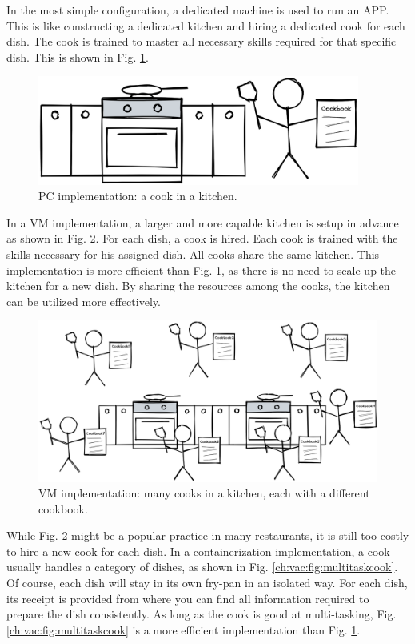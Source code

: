 In the most simple configuration, a dedicated machine is used to run an APP. This is like constructing a dedicated kitchen and hiring a dedicated cook for each dish. The cook is trained to master all necessary skills required for that specific dish. This is shown in Fig. \ref{ch:vac:fig:acookinakitchen}.
\begin{figure}
	\centering
	\includegraphics[width=300pt]{chapters/ch-virtualization-and-containerization/figures/acookinakitchen.png}
	\caption{PC implementation: a cook in a kitchen.} \label{ch:vac:fig:acookinakitchen}
\end{figure}

In a VM implementation, a larger and more capable kitchen is setup in advance as shown in Fig. \ref{ch:vac:fig:manycooksinakitchen}. For each dish, a cook is hired. Each cook is trained with the skills necessary for his assigned dish. All cooks share the same kitchen. This implementation is more efficient than Fig. \ref{ch:vac:fig:acookinakitchen}, as there is no need to scale up the kitchen for a new dish. By sharing the resources among the cooks, the kitchen can be utilized more effectively.
\begin{figure}
	\centering \includegraphics[width=350pt]{chapters/ch-virtualization-and-containerization/figures/manycooksinakitchen.png}
	\caption{VM implementation: many cooks in a kitchen, each with a different cookbook.} \label{ch:vac:fig:manycooksinakitchen}
\end{figure}

While Fig. \ref{ch:vac:fig:manycooksinakitchen} might be a popular practice in many restaurants, it is still too costly to hire a new cook for each dish. In a containerization implementation, a cook usually handles a category of dishes, as shown in Fig. \ref{ch:vac:fig:multitaskcook}. Of course, each dish will stay in its own fry-pan in an isolated way. For each dish, its receipt is provided from where you can find all information required to prepare the dish consistently. As long as the cook is good at multi-tasking, Fig. \ref{ch:vac:fig:multitaskcook} is a more efficient implementation than Fig. \ref{ch:vac:fig:acookinakitchen}.

